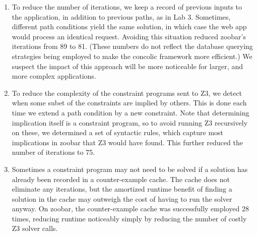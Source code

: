 \documentclass{article}
\begin{document}
\begin{enumerate}
\item To reduce the number of iterations, we keep a record of previous
  inputs to the application, in addition to previous paths, as in Lab 3. Sometimes,
  different path conditions yield the same solution, in which case
  the web app would process an identical request. Avoiding this
  situation reduced zoobar's iterations from 89 to 81. (These numbers
  do not reflect the database querying strategies being employed
  to make the concolic framework more efficient.) We suspect the impact of this
  approach will be more noticeable for larger, and more complex applications.

\item To reduce the complexity of the constraint programs sent to Z3,
  we detect when some subet of the constraints are implied by others. This is done each
  time we extend a path condition by a new constraint. Note that
  determining implication itself is a constraint program, so to avoid
  running Z3 recursively on these, we determined a set of syntactic rules, which
  capture most implications in zoobar that Z3 would have found. This
  further reduced the number of iterations to 75.

\item Sometimes a constraint program may not need to be solved if a
  solution has already been recorded in a counter-example cache. The
  cache does not eliminate any iterations, but the amortized runtime
  benefit of finding a solution in the cache may outweigh the cost of
  having to run the solver anyway. On zoobar, the counter-example
  cache was successfully employed 28 times, reducing runtime noticeably simply
  by reducing the number of costly Z3 solver calls.
\end{enumerate}
\end{document}
